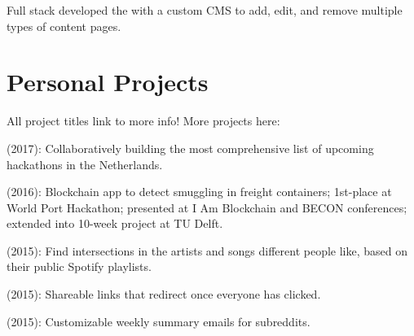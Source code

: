 \documentclass[]{deedy-resume-openfont}
\begin{document}
\begin{minipage}[t]{0.66\textwidth}
\begin{tightemize}
    \item Full stack developed the \href{http://mugsy.tv/}{} with a custom CMS to add, edit, and remove multiple types of content pages.
\end{tightemize}


\section{Personal Projects}

All project titles link to more info! More projects here: \href{http://leonoverweel.com/}{}

\begin{tightemize}
    \item \href{http://hackathonlist.nl/}{} (2017): Collaboratively building the most comprehensive list of upcoming hackathons in the Netherlands.
    \item \href{http://leonoverweel.com/world-port-hackathon-2016}{} (2016): Blockchain app to detect smuggling in freight containers; 1st-place at World Port Hackathon; presented at I Am Blockchain and BECON conferences; extended into 10-week project at TU Delft.
    \item \href{http://leonoverweel.com/intersect.ninja}{} (2015): Find intersections in the artists and songs different people like, based on their public Spotify playlists.
    \item \href{http://leonoverweel.com/link-syncer}{} (2015): Shareable links that redirect once everyone has clicked. \item \href{http://leonoverweel.com/reddit-weekly}{} (2015): Customizable weekly summary emails for subreddits.
\end{tightemize}



\end{minipage}
\end{document}
